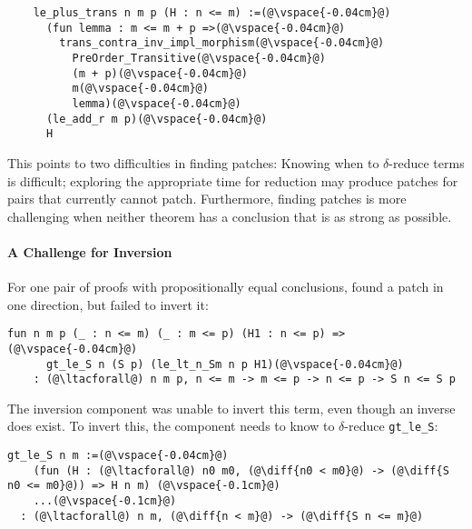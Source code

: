 \begin{lstlisting}
    le_plus_trans n m p (H : n <= m) :=(@\vspace{-0.04cm}@)
      (fun lemma : m <= m + p =>(@\vspace{-0.04cm}@)
        trans_contra_inv_impl_morphism(@\vspace{-0.04cm}@)
          PreOrder_Transitive(@\vspace{-0.04cm}@)
          (m + p)(@\vspace{-0.04cm}@)
          m(@\vspace{-0.04cm}@)
          lemma)(@\vspace{-0.04cm}@)
      (le_add_r m p)(@\vspace{-0.04cm}@)
      H
\end{lstlisting}

This points to two difficulties in finding patches: Knowing when to $\delta$-reduce terms 
is difficult; exploring the appropriate time for reduction
may produce patches for pairs that \sysname currently cannot patch.
Furthermore, finding patches is more challenging
when neither theorem has a conclusion that is as strong as possible.

\paragraph{A Challenge for Inversion} For one pair of proofs with propositionally equal conclusions,
\sysname found a patch in one direction, but failed to invert it:

\begin{lstlisting}[language=coq]
    fun n m p (_ : n <= m) (_ : m <= p) (H1 : n <= p) =>(@\vspace{-0.04cm}@)
      gt_le_S n (S p) (le_lt_n_Sm n p H1)(@\vspace{-0.04cm}@)
    : (@\ltacforall@) n m p, n <= m -> m <= p -> n <= p -> S n <= S p
\end{lstlisting}

The inversion component was unable to invert this term, even though an inverse does exist.
To invert this, the component needs to know to $\delta$-reduce \lstinline{gt_le_S}:

\begin{lstlisting}[language=coq]
  gt_le_S n m :=(@\vspace{-0.04cm}@)
    (fun (H : (@\ltacforall@) n0 m0, (@\diff{n0 < m0}@) -> (@\diff{S n0 <= m0}@)) => H n m) (@\vspace{-0.1cm}@)
    ...(@\vspace{-0.1cm}@)
  : (@\ltacforall@) n m, (@\diff{n < m}@) -> (@\diff{S n <= m}@)
\end{lstlisting}

